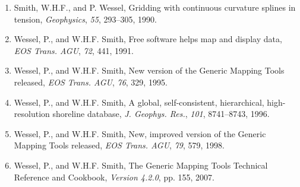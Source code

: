 \documentclass{report}
\begin{document}
\begin{enumerate}

\item Smith, W.H.F., and P. Wessel, Gridding with continuous curvature
splines in tension, {\it Geophysics}, {\it 55}, 293--305, 1990.

\item Wessel, P., and W.H.F. Smith, Free software helps map and
display data, {\it EOS Trans. AGU}, {\it 72}, 441, 1991.

\item Wessel, P., and W.H.F. Smith, New version of the Generic
Mapping Tools released, {\it EOS Trans. AGU}, {\it 76}, 329, 1995.

\item Wessel, P., and W.H.F. Smith, A global, self-consistent,
hierarchical, high-resolution shoreline database, {\it J. Geophys. Res.},
{\it 101}, 8741--8743, 1996.

\item Wessel, P., and W.H.F. Smith, New, improved version of the Generic
Mapping Tools released, {\it EOS Trans. AGU}, {\it 79}, 579, 1998.

\item Wessel, P., and W.H.F. Smith, The Generic Mapping Tools Technical Reference and Cookbook, {\it Version 4.2.0}, pp. 155, 2007.

\end{enumerate}

\clearpage
\thispagestyle{headings}
\printindex
\end{document}
